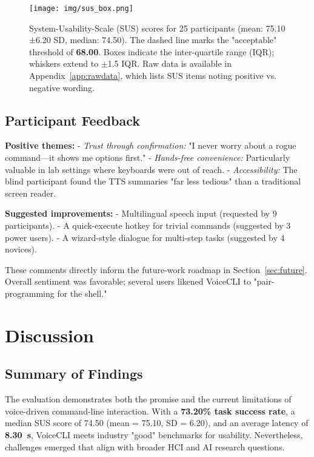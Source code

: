 \documentclass[a4paper,12pt]{article}
\begin{document}
\begin{figure}[H]
  \centering
  \texttt{[image: img/sus\_box.png]}
  \caption{System-Usability-Scale (SUS) scores for 25 participants (mean: 75.10 ±6.20 SD, median: 74.50). The dashed line marks the "acceptable" threshold of \textbf{68.00}. Boxes indicate the inter-quartile range (IQR); whiskers extend to $\pm$1.5 IQR. Raw data is available in Appendix~\ref{app:rawdata}, which lists SUS items noting positive vs. negative wording.}
  \label{fig:susdistribution}
\end{figure}

\subsection{Participant Feedback}

\noindent \textbf{Positive themes:}
- \textit{Trust through confirmation:} "I never worry about a rogue command—it shows me options first."
- \textit{Hands-free convenience:} Particularly valuable in lab settings where keyboards were out of reach.
- \textit{Accessibility:} The blind participant found the TTS summaries "far less tedious" than a traditional screen reader.

\noindent \textbf{Suggested improvements:}
- Multilingual speech input (requested by 9 participants).
- A quick-execute hotkey for trivial commands (suggested by 3 power users).
- A wizard-style dialogue for multi-step tasks (suggested by 4 novices).

These comments directly inform the future-work roadmap in Section~\ref{sec:future}. Overall sentiment was favorable; several users likened VoiceCLI to "pair-programming for the shell."






\newpage
\section{Discussion}

\subsection{Summary of Findings}
The evaluation demonstrates both the promise and the current limitations of voice-driven command-line interaction. With a \textbf{73.20\% task success rate}, a median SUS score of 74.50 (mean = 75.10, SD = 6.20), and an average latency of \textbf{8.30~s}, VoiceCLI meets industry "good" benchmarks for usability. Nevertheless, challenges emerged that align with broader HCI and AI research questions.
\end{document}
